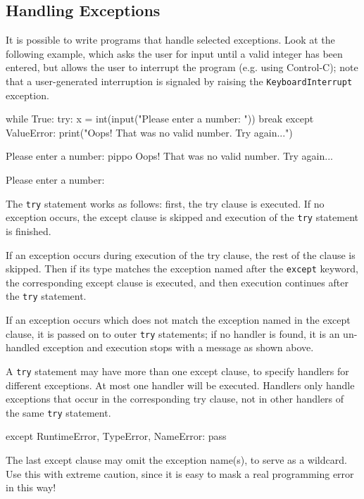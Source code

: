 \subsection{Handling Exceptions}
It is possible to write programs that handle selected exceptions. Look at the following example, which asks the user for input until a valid integer has been entered, but allows the user to interrupt the program (e.g. using Control-C); note that a user-generated interruption is signaled by raising the \texttt{KeyboardInterrupt} exception.

\begin{ipythonnon}
while True: 
    try:
        x = int(input("Please enter a number: ")) 
        break
    except ValueError:
        print("Oops! That was no valid number. Try again...")
\end{ipythonnon}
\begin{ioutput}
Please enter a number: pippo
Oops!  That was no valid number.  Try again...

Please enter a number:
\end{ioutput}

The \texttt{try} statement works as follows: first, the try clause is executed. If no exception occurs, the except clause is skipped and execution of the \texttt{try} statement is finished.

If an exception occurs during execution of the try clause, the rest of the clause is skipped. Then if its type matches the exception named after the \texttt{except} keyword, the corresponding except clause is executed, and then execution continues after the \texttt{try} statement.

If an exception occurs which does not match the exception named in the except clause, it is passed on to outer \texttt{try} statements; if no handler is found, it is an un-handled exception and execution stops with a message as shown above.

A \texttt{try} statement may have more than one except clause, to specify handlers for different exceptions. At most one handler will be executed. Handlers only handle exceptions that occur in the corresponding try clause, not in other handlers of the same \texttt{try} statement.

\begin{ipythonnon}
except RuntimeError, TypeError, NameError:
    pass	
\end{ipythonnon}

The last except clause may omit the exception name(s), to serve as a wildcard. Use this with extreme caution, since it is easy to mask a real programming error in this way! 

